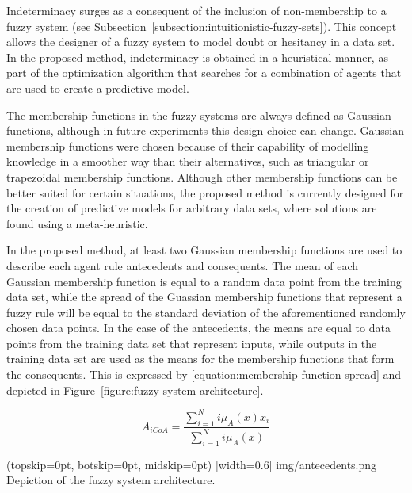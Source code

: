 \documentclass{ieeeaccess}
\begin{document}
Indeterminacy surges as a consequent of the inclusion of non-membership to a
fuzzy system (see Subsection~\ref{subsection:intuitionistic-fuzzy-sets}). This
concept allows the designer of a fuzzy system to model doubt or hesitancy in a
data set. In the proposed method, indeterminacy is obtained in a heuristical
manner, as part of the optimization algorithm that searches for a combination of
agents that are used to create a predictive model.

The membership functions in the fuzzy systems are always defined as Gaussian
functions, although in future experiments this design choice can
change. Gaussian membership functions were chosen because of their capability of
modelling knowledge in a smoother way than their alternatives, such as
triangular or trapezoidal membership functions. Although other membership
functions can be better suited for certain situations, the proposed method is
currently designed for the creation of predictive models for arbitrary data sets,
where solutions are found using a meta-heuristic.



In the proposed method, at least two Gaussian membership functions are used to
describe each agent rule antecedents and consequents. The mean of each Gaussian
membership function is equal to a random data point from the training data set,
while the spread of the Guassian membership functions that represent a fuzzy
rule will be equal to the standard deviation of the aforementioned randomly
chosen data points. In the case of the antecedents, the means are equal to data
points from the training data set that represent inputs, while outputs in the
training data set are used as the means for the membership functions that form
the consequents. This is expressed by
\ref{equation:membership-function-spread} and depicted in
Figure~\ref{figure:fuzzy-system-architecture}.

\begin{equation}
  \label{equation:membership-function-spread}
  A_{iCoA} = \dfrac{\sum_{i=1}^{N} i\mu_{A}(x) x_{i}}{\sum_{i=1}^{N}
    i\mu_{A}(x)}
\end{equation}

\Figure[](topskip=0pt, botskip=0pt, midskip=0pt)
[width=0.6\linewidth]
{img/antecedents.png}
{Depiction of the fuzzy system architecture.
  \label{figure:fuzzy-system-architecture}}
\end{document}
